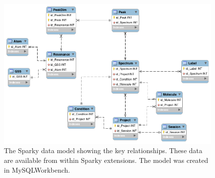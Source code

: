 \begin{figure}
  \includegraphics[scale=0.5]{figures/sparky_model}
  \caption[The Sparky data model.]
          {The Sparky data model showing the key relationships.
           These data are available from within Sparky extensions.
           The model was created in MySQLWorkbench.}
  \label{sparky_model}
\end{figure}

